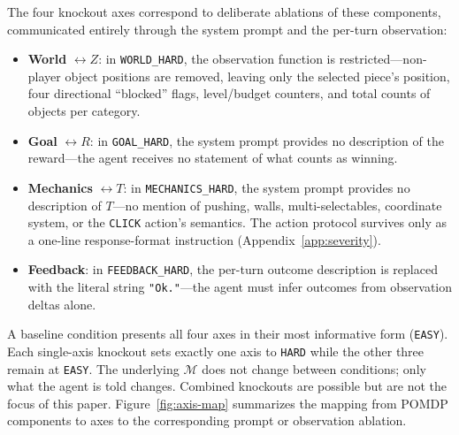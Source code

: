 \documentclass{article}
\begin{document}
The four knockout axes correspond to deliberate ablations of these components, communicated entirely through the system prompt and the per-turn observation:
\begin{itemize}
  \item \textbf{World} $\leftrightarrow Z$: in \texttt{WORLD\_HARD}, the observation function is restricted---non-player object positions are removed, leaving only the selected piece's position, four directional ``blocked'' flags, level/budget counters, and total counts of objects per category.
  \item \textbf{Goal} $\leftrightarrow R$: in \texttt{GOAL\_HARD}, the system prompt provides no description of the reward---the agent receives no statement of what counts as winning.
  \item \textbf{Mechanics} $\leftrightarrow T$: in \texttt{MECHANICS\_HARD}, the system prompt provides no description of $T$---no mention of pushing, walls, multi-selectables, coordinate system, or the \texttt{CLICK} action's semantics. The action protocol survives only as a one-line response-format instruction (Appendix~\ref{app:severity}).
  \item \textbf{Feedback}: in \texttt{FEEDBACK\_HARD}, the per-turn outcome description is replaced with the literal string \texttt{"Ok."}---the agent must infer outcomes from observation deltas alone.
\end{itemize}
A baseline condition presents all four axes in their most informative form (\texttt{EASY}). Each single-axis knockout sets exactly one axis to \texttt{HARD} while the other three remain at \texttt{EASY}. The underlying $\mathcal{M}$ does not change between conditions; only what the agent is told changes. Combined knockouts are possible but are not the focus of this paper. Figure~\ref{fig:axis-map} summarizes the mapping from POMDP components to axes to the corresponding prompt or observation ablation.
\end{document}
